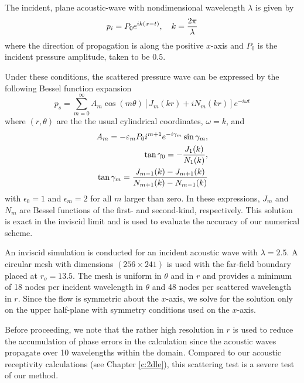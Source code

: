 The incident, plane acoustic-wave with nondimensional wavelength $\lambda$ is
given by
%
\begin{equation}
 p_i = P_0 e^{ i k (x - t) }, \quad k = {{2 \pi}\over{\lambda}}
\end{equation}
%
where the direction of propagation is along the positive $x$-axis and $P_0$ is
the incident pressure amplitude, taken to be $0.5$.

Under these conditions, the scattered pressure wave can be expressed by the
following Bessel function expansion \cite{MoIn:68}
%
\begin{equation}
p_s = \sum_{m=0}^{\infty} A_m \cos(m\theta)
      [ J_m(kr) + iN_m(kr)] e^{-i\omega t}
\end{equation}
%
where $(r,\theta)$ are the the usual cylindrical coordinates, $\omega=k$, and
%
\begin{eqnarray}
  A_m = -\epsilon_m P_0 i^{m+1} e^{-i\gamma_m}\sin\gamma_m , \\
         \tan \gamma_0 = -{{J_1(k)}\over{N_1(k)}} , \\ 
         \tan \gamma_m = {{J_{m-1}(k) - J_{m+1}(k)}\over
		          {N_{m+1}(k) - N_{m-1}(k)}}
\end{eqnarray}
%
with $\epsilon_0=1$ and $\epsilon_m = 2$ for all $m$ larger than zero.  In
these expressions, $J_m$ and $N_m$ are Bessel functions of the first- and
second-kind, respectively.  This solution is exact in the inviscid limit and
is used to evaluate the accuracy of our numerical scheme.

An inviscid simulation is conducted for an incident acoustic wave with
$\lambda = 2.5$.  A circular mesh with dimensions $(256 \times 241)$ is used
with the far-field boundary placed at $r_o=13.5$.  The mesh is uniform in
$\theta$ and in $r$ and provides a minimum of 18 nodes per incident wavelength
in $\theta$ and 48 nodes per scattered wavelength in $r$.  Since the flow is
symmetric about the $x$-axis, we solve for the solution only on the upper
half-plane with symmetry conditions used on the $x$-axis.

Before proceeding, we note that the rather high resolution in $r$ is used to
reduce the accumulation of phase errors in the calculation since the acoustic
waves propagate over 10 wavelengths within the domain.  Compared to our
acoustic receptivity calculations (see Chapter \ref{c:2dle}), this scattering
test is a severe test of our method.


